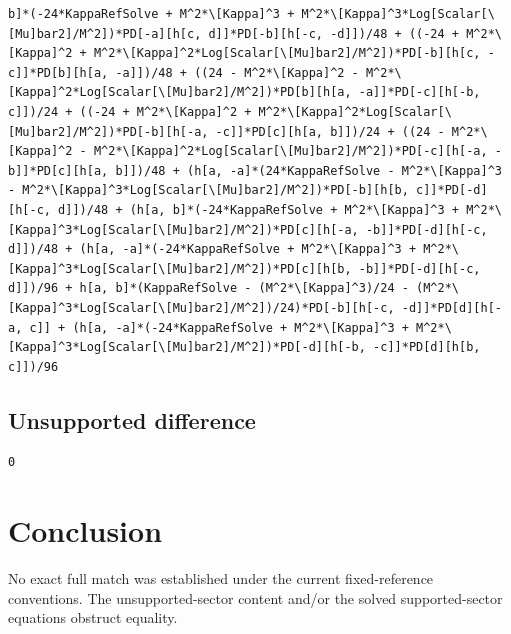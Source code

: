\documentclass[11pt]{article}
\begin{document}
\begin{verbatim}
b]*(-24*KappaRefSolve + M^2*\[Kappa]^3 + M^2*\[Kappa]^3*Log[Scalar[\[Mu]bar2]/M^2])*PD[-a][h[c, d]]*PD[-b][h[-c, -d]])/48 + ((-24 + M^2*\[Kappa]^2 + M^2*\[Kappa]^2*Log[Scalar[\[Mu]bar2]/M^2])*PD[-b][h[c, -c]]*PD[b][h[a, -a]])/48 + ((24 - M^2*\[Kappa]^2 - M^2*\[Kappa]^2*Log[Scalar[\[Mu]bar2]/M^2])*PD[b][h[a, -a]]*PD[-c][h[-b, c]])/24 + ((-24 + M^2*\[Kappa]^2 + M^2*\[Kappa]^2*Log[Scalar[\[Mu]bar2]/M^2])*PD[-b][h[-a, -c]]*PD[c][h[a, b]])/24 + ((24 - M^2*\[Kappa]^2 - M^2*\[Kappa]^2*Log[Scalar[\[Mu]bar2]/M^2])*PD[-c][h[-a, -b]]*PD[c][h[a, b]])/48 + (h[a, -a]*(24*KappaRefSolve - M^2*\[Kappa]^3 - M^2*\[Kappa]^3*Log[Scalar[\[Mu]bar2]/M^2])*PD[-b][h[b, c]]*PD[-d][h[-c, d]])/48 + (h[a, b]*(-24*KappaRefSolve + M^2*\[Kappa]^3 + M^2*\[Kappa]^3*Log[Scalar[\[Mu]bar2]/M^2])*PD[c][h[-a, -b]]*PD[-d][h[-c, d]])/48 + (h[a, -a]*(-24*KappaRefSolve + M^2*\[Kappa]^3 + M^2*\[Kappa]^3*Log[Scalar[\[Mu]bar2]/M^2])*PD[c][h[b, -b]]*PD[-d][h[-c, d]])/96 + h[a, b]*(KappaRefSolve - (M^2*\[Kappa]^3)/24 - (M^2*\[Kappa]^3*Log[Scalar[\[Mu]bar2]/M^2])/24)*PD[-b][h[-c, -d]]*PD[d][h[-a, c]] + (h[a, -a]*(-24*KappaRefSolve + M^2*\[Kappa]^3 + M^2*\[Kappa]^3*Log[Scalar[\[Mu]bar2]/M^2])*PD[-d][h[-b, -c]]*PD[d][h[b, c]])/96
\end{verbatim}
\subsection{Unsupported difference}
\begin{verbatim}
0
\end{verbatim}
\section{Conclusion}
No exact full match was established under the current fixed-reference conventions. The unsupported-sector content and/or the solved supported-sector equations obstruct equality.
\end{document}
